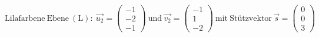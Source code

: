 \documentclass[preview]{standalone}
\begin{document}
\begin{center}
$\mathrm{Lilafarbene \: Ebene \: (L):} \: \vec{u_2} = \begin{pmatrix} -1 \\ -2 \\ -1 \end{pmatrix} \: \mathrm{und} \: \vec{v_2} = \begin{pmatrix} -1 \\ 1 \\ -2 \end{pmatrix} \: \mathrm{mit \: St\text{ü}tzvektor} \: \vec{s} = \begin{pmatrix} 0 \\ 0 \\ 3 \end{pmatrix}$
\end{center}
\end{document}
